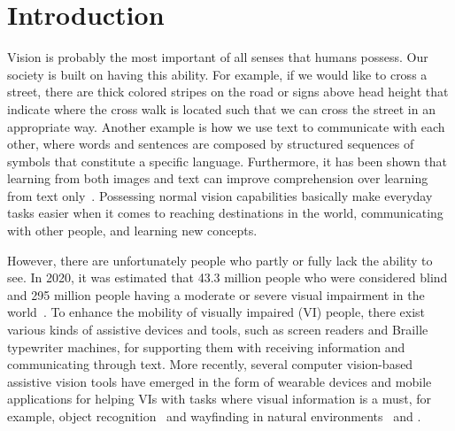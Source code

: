 
\chapter{Introduction}
\label{chap:introduction}

Vision is probably the most important of all senses that humans possess. Our society is built on having this ability. For example, if we would like to cross a street, there are thick colored stripes on the road or signs above head height that indicate where the cross walk is located such that we can cross the street in an appropriate way. Another example is how we use text to communicate with each other, where words and sentences are composed by structured sequences of symbols that constitute a specific language. 
Furthermore, it has been shown that learning from both images and text can improve comprehension over learning from text only~\cite{eitel2013picture, hibbing2003picture}. 
Possessing normal vision capabilities basically make everyday tasks easier when it comes to reaching destinations in the world, communicating with other people, and learning new concepts.  

However, there are unfortunately people who partly or fully lack the ability to see.
In 2020, it was estimated that 43.3 million people who were considered blind and 295 million people having a moderate or severe visual impairment in the world~\cite{bourne2021trends}. To enhance the mobility of visually impaired (VI) people, there exist various kinds of assistive devices and tools, such as screen readers and Braille typewriter machines, for supporting them with receiving information and communicating through text. More recently, several computer vision-based assistive vision tools have emerged in the form of wearable devices and mobile applications for helping VIs with tasks where visual information is a must, for example, object recognition~\cite{ahmetovic2020recog, jafri2014computer, kacorri2017teachable} and wayfinding in natural environments~\cite{coughlan2009functional, kacorri2018environmental, loomis2020assisting} and . 

